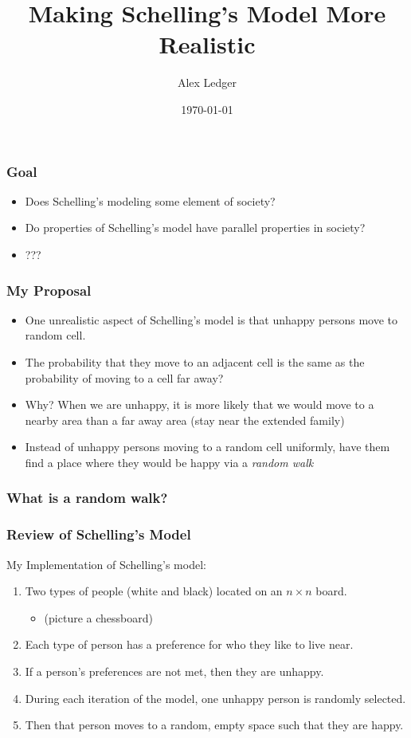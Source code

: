 \documentclass[11pt, handout]{beamer}
\title[Short title]{Making Schelling's Model More Realistic} %
\author{Alex Ledger} %
\institute[Reed College] %
{
Reed College \\ 
\medskip
\textit{aledger@reed.edu}
}
\date{\today} %
\begin{document}
\begin{frame}
\titlepage 
\end{frame}

\begin{frame}
    \frametitle{Goal}
    \begin{itemize}
        \item Does Schelling's modeling some element of society?
        \item Do properties of Schelling's model have parallel properties in society?
        \item ???
    \end{itemize}
\end{frame}

\begin{frame}
    \frametitle{My Proposal}
    \begin{itemize}
        \item One unrealistic aspect of Schelling's model is that unhappy persons move to random cell.
        \item The probability that they move to an adjacent cell is the same as the probability of moving to a cell far away?
        \item Why? When we are unhappy, it is more likely that we would move to a nearby area than a far away area (stay near the extended family)
        \item Instead of unhappy persons moving to a random cell uniformly, have them find a place where they would be happy via a \emph{random walk}
    \end{itemize}
\end{frame}

\begin{frame}
    \frametitle{What is a random walk?}
\end{frame}

\begin{frame}
    \frametitle{Review of Schelling's Model}
    My Implementation of Schelling's model:
    \begin{enumerate}
        \item Two types of people (white and black) located on an $n \times n$ board.
            \begin{itemize}
                \item (picture a chessboard)
            \end{itemize}
        \item Each type of person has a preference for who they like to live near.
        \item If a person's preferences are not met, then they are unhappy.
        \item During each iteration of the model, one unhappy person is randomly selected.
        \item Then that person moves to a random, empty space such that they are happy.
    \end{enumerate}
\end{frame}
\end{document}
